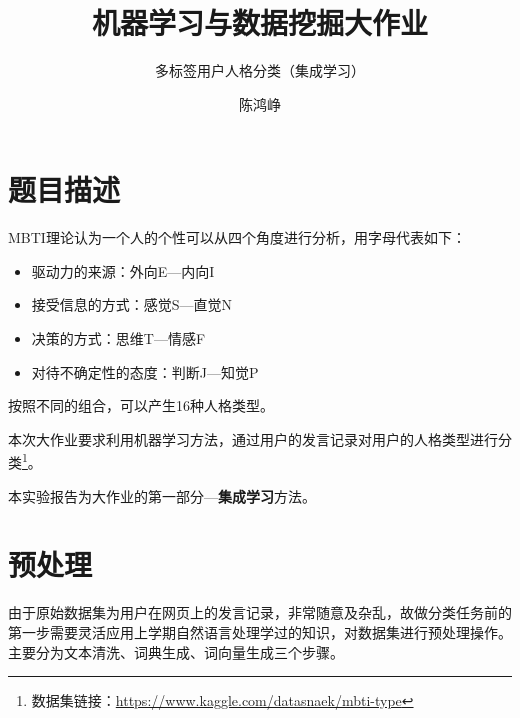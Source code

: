 \documentclass[logo,reportComp]{thesis}
\title{机器学习与数据挖掘大作业}
\subtitle{多标签用户人格分类（集成学习）}
\author{陈鸿峥}
\begin{document}
\maketitle
\tableofcontents

\newpage
\section{题目描述}
MBTI理论认为一个人的个性可以从四个角度进行分析，用字母代表如下：
\begin{itemize}
    \item 驱动力的来源：外向E---内向I
    \item 接受信息的方式：感觉S---直觉N
    \item 决策的方式：思维T---情感F
    \item 对待不确定性的态度：判断J---知觉P
\end{itemize}
按照不同的组合，可以产生16种人格类型。

本次大作业要求利用机器学习方法，通过用户的发言记录对用户的人格类型进行分类\footnote{数据集链接：\url{https://www.kaggle.com/datasnaek/mbti-type}}。

本实验报告为大作业的第一部分---\textbf{集成学习}方法。

\section{预处理}
由于原始数据集为用户在网页上的发言记录，非常随意及杂乱，故做分类任务前的第一步需要灵活应用上学期自然语言处理学过的知识，对数据集进行预处理操作。
主要分为文本清洗、词典生成、词向量生成三个步骤。
\end{document}
